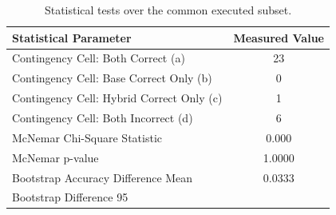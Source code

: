 \begin{table}[htbp]
  \centering
  \caption{Statistical tests over the common executed subset.}
  \label{tab:expanded_eval}
  \begin{tabular}{lc}
    \toprule
    Statistical Parameter & Measured Value \\
    \midrule
    Contingency Cell: Both Correct (a) & 23 \\
    Contingency Cell: Base Correct Only (b) & 0 \\
    Contingency Cell: Hybrid Correct Only (c) & 1 \\
    Contingency Cell: Both Incorrect (d) & 6 \\
    McNemar Chi-Square Statistic & 0.000 \\
    McNemar p-value & 1.0000 \\
    Bootstrap Accuracy Difference Mean & 0.0333 \\
    Bootstrap Difference 95%
    \bottomrule
  \end{tabular}
\end{table}